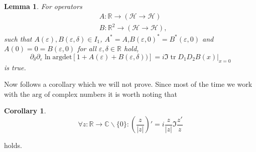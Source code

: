 \documentclass[oneside,reqno,12pt]{amsart}
\newtheorem{lemma}{Lemma}
\newtheorem{Corollary}[Def]{Corollary}
\DeclareMathOperator{\tr}{tr}
\begin{document}
\begin{lemma}
For operators 
\begin{align*}
&A: \mathbb{R}\rightarrow \left( \mathcal{H}\rightarrow\mathcal{H}\right)\\
&B: \mathbb{R}^2 \rightarrow \left( \mathcal{H}\rightarrow\mathcal{H}\right),
\end{align*}
such that \(A(\varepsilon),B(\varepsilon,\delta)\in I_1\), \(A^*=A\),\(B(\varepsilon,0)^*=B^*(\varepsilon,0)\) and \(A(0)=0=B(\varepsilon,0)\) for all \(\varepsilon,\delta\in\mathbb{R}\) hold, 
\begin{equation}
\partial_\delta \partial_\varepsilon \ln \text{argdet}\left[ 1 + A(\varepsilon) + B(\varepsilon,\delta))\right] 
= i \Im \tr D_1 D_2 B(x)|_{x=0}
\end{equation}
is true.
\end{lemma}
Now follows a corollary which we will not prove.
Since most of the time we work with the \(\text{arg}\) of complex numbers it is worth noting that
\begin{Corollary}\label{corollary:phase'}
\begin{equation}
\forall z:\mathbb{R}\rightarrow \mathbb{C}\backslash \{0\}: \left( \frac{z}{|z|}\right)'=  i \frac{z}{|z|} \Im \frac{ z'}{z}
\end{equation}
\end{Corollary}
holds. 
\end{document}
